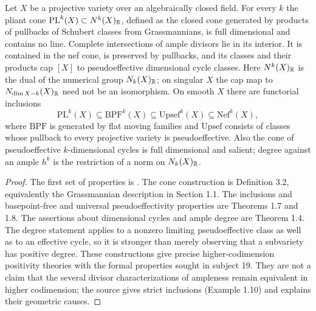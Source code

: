 \begin{theorem}\label{thm:B3-positive-cones}
Let $X$ be a projective variety over an algebraically closed field.
For every $k$ the pliant cone $\mathrm{PL}^k(X)\subset N^k(X)_{\mathbb{R}}$,
defined as the closed cone generated by products of pullbacks of
Schubert classes from Grassmannians, is full dimensional and contains
no line. Complete intersections of ample divisors lie in its interior.
It is contained in the nef cone, is preserved by pullbacks, and its
classes and their products cap $[X]$ to pseudoeffective dimensional
cycle classes. Here $N^k(X)_{\mathbb{R}}$ is the dual of the numerical group
$N_k(X)_{\mathbb{R}}$; on singular $X$ the cap map to $N_{\dim X-k}(X)_{\mathbb{R}}$
need not be an isomorphism. On smooth $X$ there are functorial inclusions
\[
 \mathrm{PL}^k(X)\subseteq\mathrm{BPF}^k(X)
 \subseteq\mathrm{Upsef}^k(X)\subseteq\mathrm{Nef}^k(X),
\]
where $\mathrm{BPF}$ is generated by flat moving families and
$\mathrm{Upsef}$ consists of classes whose pullback to every projective
variety is pseudoeffective. Also the cone of pseudoeffective
$k$-dimensional cycles is full dimensional and salient; degree against
an ample $h^k$ is the restriction of a norm on $N_k(X)_{\mathbb{R}}$.
\end{theorem}
\begin{proof}
The first set of properties is
\cite[Theorem 1.3, proved by Lemmas 3.5, 3.7, 3.14]{BFulgerLehmann}.
The cone construction is Definition 3.2, equivalently the
Grassmannian description in Section 1.1. The inclusions and
basepoint-free and universal pseudoeffectivity properties are
Theorems 1.7 and 1.8. The assertions about dimensional cycles and
ample degree are Theorem 1.4. The degree statement applies to a
nonzero limiting pseudoeffective class as well as to an effective
cycle, so it is stronger than merely observing that a subvariety has
positive degree. These constructions give precise higher-codimension
positivity theories with the formal properties sought in subject 19.
They are not a claim that the several divisor characterizations of
ampleness remain equivalent in higher codimension; the source gives
strict inclusions (Example 1.10) and explains their geometric causes.
\end{proof}

